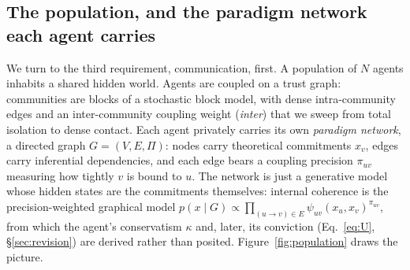 \documentclass[runningheads]{llncs}
\begin{document}
\subsection{The population, and the paradigm network each agent carries}
\label{sec:carryover}

We turn to the third requirement, communication, first. A population of $N$ agents inhabits a
shared hidden world. Agents are
coupled on a trust graph: communities are blocks of a stochastic block model, with dense
intra-community edges and an inter-community coupling weight (\emph{inter}) that we sweep from
total isolation to dense contact. Each agent privately carries its own \emph{paradigm network}, a directed graph
$G=(V,E,\Pi)$: nodes carry theoretical commitments $x_v$, edges carry inferential dependencies,
and each edge bears a coupling precision $\pi_{uv}$ measuring how tightly $v$ is bound to $u$.
The network is just a generative model whose hidden states are the commitments themselves:
internal coherence is the precision-weighted graphical model
$p(x\mid G)\propto\prod_{(u\to v)\in E}\psi_{uv}(x_u,x_v)^{\pi_{uv}}$, from which the agent's
conservatism $\kappa$ and, later, its conviction (Eq.~\ref{eq:U}, \S\ref{sec:revision}) are
derived rather than posited. Figure~\ref{fig:population} draws the picture.
\end{document}

